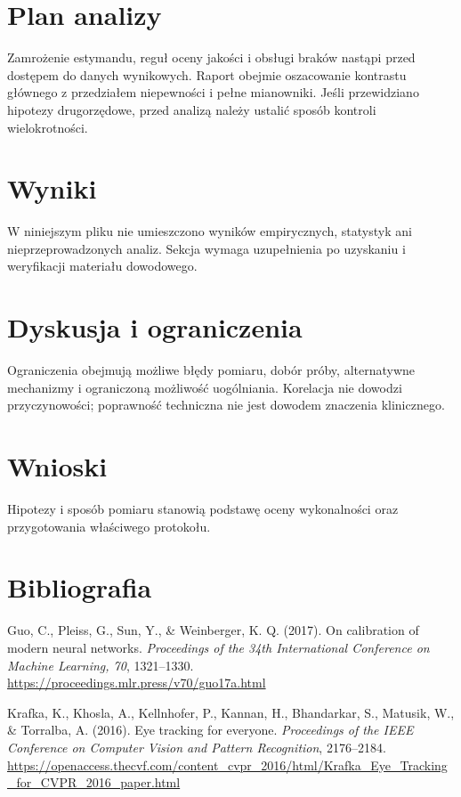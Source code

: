\documentclass[11pt,a4paper]{article}
\begin{document}
\section{Plan analizy}

Zamrożenie estymandu, reguł oceny jakości i obsługi braków nastąpi przed dostępem do danych wynikowych. Raport obejmie oszacowanie kontrastu głównego z przedziałem niepewności i pełne mianowniki. Jeśli przewidziano hipotezy drugorzędowe, przed analizą należy ustalić sposób kontroli wielokrotności.

\section{Wyniki}

W niniejszym pliku nie umieszczono wyników empirycznych, statystyk ani nieprzeprowadzonych analiz. Sekcja wymaga uzupełnienia po uzyskaniu i weryfikacji materiału dowodowego.

\section{Dyskusja i ograniczenia}

Ograniczenia obejmują możliwe błędy pomiaru, dobór próby, alternatywne mechanizmy i ograniczoną możliwość uogólniania. Korelacja nie dowodzi przyczynowości; poprawność techniczna nie jest dowodem znaczenia klinicznego.

\section{Wnioski}

Hipotezy i sposób pomiaru stanowią podstawę oceny wykonalności oraz przygotowania właściwego protokołu.

\section*{Bibliografia}

{\setlength{\parindent}{0pt}
\setlength{\parskip}{5pt}
\hangindent=1.27cm
Guo, C., Pleiss, G., Sun, Y., \& Weinberger, K. Q. (2017). On calibration of modern neural networks. \textit{Proceedings of the 34th International Conference on Machine Learning, 70}, 1321--1330. \url{https://proceedings.mlr.press/v70/guo17a.html}\par
\hangindent=1.27cm
Krafka, K., Khosla, A., Kellnhofer, P., Kannan, H., Bhandarkar, S., Matusik, W., \& Torralba, A. (2016). Eye tracking for everyone. \textit{Proceedings of the IEEE Conference on Computer Vision and Pattern Recognition}, 2176--2184. \url{https://openaccess.thecvf.com/content_cvpr_2016/html/Krafka_Eye_Tracking_for_CVPR_2016_paper.html}\par
}
\end{document}
